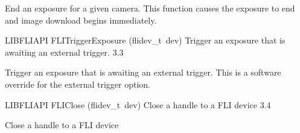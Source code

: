 \documentclass{article}
\begin{document}
\begin{cxxentry}
\begin{cxxfunction}
\begin{cxxdoc}
End an exposure for a given camera.  This function causes the exposure
to end and image download begins immediately.


\end{cxxdoc}
\end{cxxfunction}
\begin{cxxfunction}
{LIBFLIAPI}
        {FLITriggerExposure}
        {(flidev\_t\ dev)}
        { Trigger an exposure that is awaiting an external trigger.}
        {3.3}
\begin{cxxdoc}

Trigger an exposure that is awaiting an external trigger. This is a 
software override for the external trigger option.


\end{cxxdoc}
\end{cxxfunction}
\begin{cxxfunction}
{LIBFLIAPI}
        {FLIClose}
        {(flidev\_t\ dev)}
        { Close a handle to a FLI device  }
        {3.4}
\begin{cxxdoc}

Close a handle to a FLI device



\end{cxxdoc}
\end{cxxfunction}
\end{cxxentry}
\end{document}
